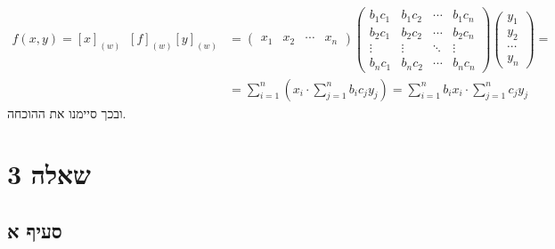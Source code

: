\documentclass{article}
\DeclareMathOperator{\tra}{^t}
\begin{document}
\begin{align*}
    f(x,y)=[x]_{(w)}\tra [f]_{(w)} [y]_{(w)} & =\begin{pmatrix}
                                                    x_1 & x_2 & \cdots & x_n
                                                \end{pmatrix} \begin{pmatrix}
                                                                  b_1c_1 & b_1c_2 & \cdots & b_1c_n \\
                                                                  b_2c_1 & b_2c_2 & \cdots & b_2c_n \\
                                                                  \vdots & \vdots & \ddots & \vdots \\
                                                                  b_nc_1 & b_nc_2 & \cdots & b_nc_n
                                                              \end{pmatrix} \begin{pmatrix}
                                                                                y_1    \\
                                                                                y_2    \\
                                                                                \cdots \\
                                                                                y_n
                                                                            \end{pmatrix}=                                                      \\
                                             & = \sum_{i=1}^{n}(x_i \cdot \sum_{j=1}^{n}b_ic_j y_j) = \sum_{i=1}^{n}b_ix_i \cdot \sum_{j=1}^n c_jy_j
\end{align*}
ובכך סיימנו את ההוכחה.

\pagebreak

\section*{שאלה 3}

\subsection*{סעיף א}
\end{document}
